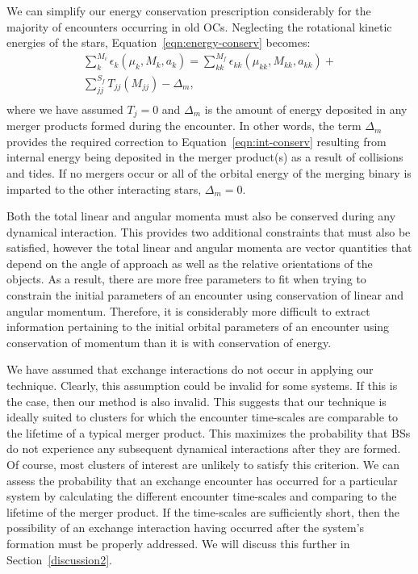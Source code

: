 We can simplify our
energy conservation prescription considerably for the majority of
encounters occurring in old OCs.  Neglecting the rotational kinetic
energies of the stars, Equation~\ref{eqn:energy-conserv} becomes: 
\begin{equation}
\begin{gathered}
\label{eqn:energy-conserv2}
\sum_k^{M_i} \epsilon_k(\mu_k,M_k,a_k) = \sum_{kk}^{M_f} \epsilon_{kk}(\mu_{kk},M_{kk},a_{kk}) + \\
\sum_{jj}^{S_f} T_{jj}(M_{jj}) - \Delta_{m}, \\
\end{gathered}
\end{equation}
where we have assumed $T_j = 0$ and $\Delta_{m}$ is the amount of
energy deposited in any merger products formed during the encounter.
In other words, the term $\Delta_{m}$ provides the required 
correction to Equation~\ref{eqn:int-conserv} resulting from 
internal energy being deposited in the merger product(s) as a result
of collisions and tides.  If no mergers occur or all of the orbital
energy of the merging binary is imparted to the other interacting stars,
$\Delta_{m} = 0$. 

Both the total linear and angular momenta must also be conserved
during any dynamical interaction.  This provides two additional
constraints that must also be satisfied, however the total linear and
angular momenta are vector quantities that depend on the angle of
approach as well as the relative orientations of the objects.  As a result,
there are more free parameters to fit when trying to constrain the
initial parameters of an encounter using conservation of linear and
angular momentum.  Therefore, it is considerably more difficult to
extract information pertaining to the initial orbital parameters of
an encounter using conservation of momentum than it is with
conservation of energy. 

We have assumed that exchange interactions do not occur in applying
our technique.  Clearly, this assumption could be invalid for some
systems.  If this is the case, then our method is also invalid.  This
suggests that our technique is ideally suited to clusters for which the
encounter time-scales are comparable to the lifetime of a typical
merger product.  This maximizes the probability that BSs do not experience
any subsequent dynamical interactions after they are formed.  
Of course, most clusters of interest are unlikely to satisfy this
criterion.  
We can assess the probability that an exchange encounter has 
occurred for a particular system by calculating the different
encounter time-scales and comparing to the lifetime of the merger
product.  If the time-scales are sufficiently short, then
the possibility of an exchange interaction having occurred after the
system's formation must be properly addressed.  We will discuss this
further in Section~\ref{discussion2}. 


